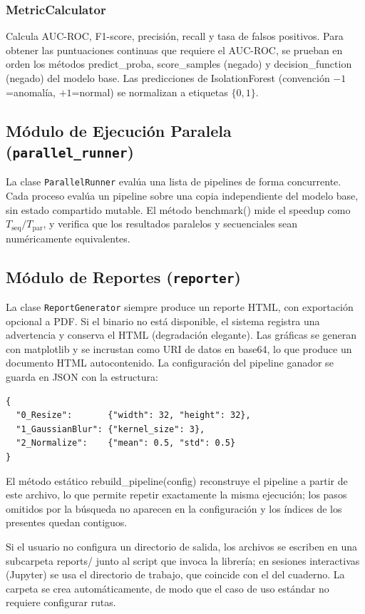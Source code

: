 \documentclass[conference,spanish]{IEEEtran}
\begin{document}
\subsubsection{MetricCalculator}

Calcula AUC-ROC, F1-score, precisión, recall y tasa de falsos positivos.
Para obtener las puntuaciones continuas que requiere el AUC-ROC, se
prueban en orden los métodos predict\_proba,
score\_samples (negado) y decision\_function (negado)
del modelo base. Las predicciones de IsolationForest (convención
$-1$=anomalía, $+1$=normal) se normalizan a etiquetas $\{0, 1\}$.

\subsection{Módulo de Ejecución Paralela (\texttt{parallel\_runner})}

La clase \texttt{ParallelRunner} evalúa una lista de pipelines de forma
concurrente. Cada
proceso evalúa un pipeline sobre una copia independiente del modelo base,
sin estado compartido mutable. El método benchmark() mide el speedup como $T_{\text{seq}} / T_{\text{par}}$, y verifica que los resultados paralelos y
secuenciales sean numéricamente equivalentes.

\subsection{Módulo de Reportes (\texttt{reporter})}

La clase \texttt{ReportGenerator} siempre produce un reporte HTML, con exportación opcional a PDF. Si el binario no está disponible, el
sistema registra una advertencia y conserva el HTML (degradación
elegante). Las gráficas se generan con matplotlib y se incrustan como URI de datos en base64, lo que produce
un documento HTML autocontenido. La configuración del pipeline ganador se
guarda en JSON con la estructura:
\begin{lstlisting}
{
  "0_Resize":       {"width": 32, "height": 32},
  "1_GaussianBlur": {"kernel_size": 3},
  "2_Normalize":    {"mean": 0.5, "std": 0.5}
}
\end{lstlisting}
El método estático rebuild\_pipeline(config) reconstruye el
pipeline a partir de este archivo, lo que permite repetir exactamente la
misma ejecución; los pasos omitidos por la búsqueda no aparecen en la
configuración y los índices de los presentes quedan contiguos.

Si el usuario no configura un directorio de salida, los archivos se
escriben en una subcarpeta reports/ 
junto al script que invoca la librería; en sesiones interactivas (Jupyter)
se usa el directorio de trabajo, que coincide con el del cuaderno. La
carpeta se crea automáticamente, de modo que el caso de uso estándar no
requiere configurar rutas.
\end{document}
